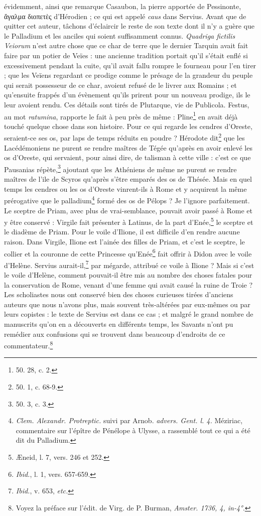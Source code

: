 \documentclass[a4paper, 11pt, oneside, polutonikogreek, french]{article}
\begin{document}
évidemment, ainsi que remarque Casaubon, la pierre apportée de Pessinonte, ἄγαλμα διοπετὲς d'Hérodien ; ce qui est appelé \emph{caus} dans Servius. Avant que de quitter cet auteur, tâchons d'éclaircir le reste de son texte dont il n'y a guère que le Palladium et les anciles qui soient suffisamment connus. \emph{Quadriga fictilis Veiorum} n'est autre chose que ce char de terre que le dernier Tarquin avait fait faire par un potier de Veïes : une ancienne tradition portait qu'il s'était enflé si excessivement pendant la cuite, qu'il avait fallu rompre le fourneau pour l'en tirer ; que les Veïens regardant ce prodige comme le présage de la grandeur du peuple qui serait possesseur de ce char, avoient refusé de le livrer aux Romains ; et qu'ensuite frappés d'un évènement qu'ils prirent pour un nouveau prodige, ils le leur avoient rendu. Ces détails sont tirés de Plutarque, vie de Publicola. Festus, au mot \emph{ratumina}, rapporte le fait à peu près de même : Pline\footnote{50. 28, c. 2.} en avait déjà touché quelque chose dans son histoire. Pour ce qui regarde les cendres d'Oreste, seraient-ce ses os, par laps de temps réduits en poudre ? Hérodote dit\footnote{50. 1, c. 68-9.} que les Lacédémoniens ne purent se rendre maîtres de Tégée qu'après en avoir enlevé les os d'Oreste, qui servaient, pour ainsi dire, de talisman à cette ville : c'est ce que Pausanias répète,\footnote{50. 3, c. 3.} ajoutant que les Athéniens de même ne purent se rendre maîtres de l'ile de Scyros qu'après s'être emparés des os de Thésée. Mais en quel temps les cendres ou les os d'Oreste vinrent-ils à Rome et y acquirent la même prérogative que le palladium\footnote{\emph{Clem. Alexandr. Protreptic.} suivi par Arnob. \emph{advers. Gent. l. 4.} Méziriac, commentaire sur l'épître de Pénélope à Ulysse, a rassemblé tout ce qui a été dit du Palladium.} formé des os de Pélops ? Je l'ignore parfaitement. Le sceptre de Priam, avec plus de vrai-semblance, pouvait avoir passé à Rome et y être conservé : Virgile fait présenter à Latinus, de la part d'Enée,\footnote{Æneid, l. 7, vers. 246 et 252.} le sceptre et le diadème de Priam. Pour le voile d'Ilione, il est difficile d'en rendre aucune raison. Dans Virgile, Ilione est l'ainée des filles de Priam, et c'est le sceptre, le collier et la couronne de cette Princesse qu'Enée\footnote{\emph{Ibid.}, l. 1, vers. 657-659.} fait offrir à Didon avec le voile d'Helène. Servius aurait-il,\footnote{\emph{Ibid.}, v. 653, \emph{etc.}} par mégarde, attribué ce voile à Ilione ? Mais si c'est le voile d'Helène, comment pouvait-il être mis au nombre des choses fatales pour la conservation de Rome, venant d'une femme qui avait causé la ruine de Troie ? Les scholiastes nous ont conservé bien des choses curieuses tirées d'anciens auteurs que nous n'avons plus, mais souvent très-altérées par eux-mêmes ou par leurs copistes : le texte de Servius est dans ce cas ; et malgré le grand nombre de manuscrits qu'on en a découverts en différents temps, les Savants n'ont pu remédier aux confusions qui se trouvent dans beaucoup d'endroits de ce commentateur.\footnote{Voyez la préface sur l'édit. de Virg. de P. Burman, \emph{Amster. 1736, 4, in-4°.}}
\end{document}
